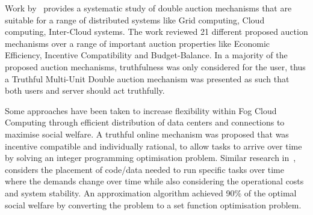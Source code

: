 Work by~\cite{KUMAR2017234} provides a systematic study of double auction mechanisms that are suitable for a range
of distributed systems like Grid computing, Cloud computing, Inter-Cloud systems. The work reviewed 21 different
proposed auction mechanisms over a range of important auction properties like Economic Efficiency,
Incentive Compatibility and Budget-Balance. In a majority of the proposed auction mechanisms, truthfulness was only
considered for the user, thus a Truthful Multi-Unit Double auction mechanism was presented as such that both users and
server should act truthfully.

Some approaches have been taken to increase flexibility within Fog Cloud Computing \citep{Bi2019} through efficient
distribution of data centers and connections to maximise social welfare. A truthful online mechanism was
proposed that was incentive compatible and individually rational, to allow tasks to arrive over time by solving an
integer programming optimisation problem. Similar research in~\cite{vaji_infocom}, considers the placement of code/data
needed to run specific tasks over time where the demands change over time while also considering the operational costs
and system stability. An approximation algorithm achieved 90\% of the optimal social welfare by converting the problem
to a set function optimisation problem.